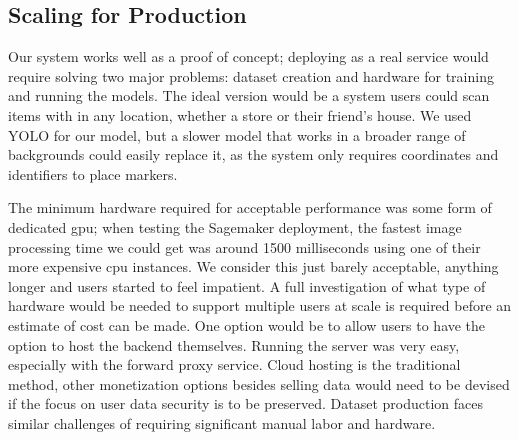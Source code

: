 \documentclass[thesis]{fputhesis}
\begin{document}
\begin{body}
\section{Scaling for Production}
Our system works well as a proof of concept; deploying as a real service would require solving two major problems: dataset creation and hardware for training and running the models. The ideal version would be a system users could scan items with in any location, whether a store or their friend's house. We used YOLO for our model, but a slower model that works in a broader range of backgrounds could easily replace it, as the system only requires coordinates and identifiers to place markers. 

The minimum hardware required for acceptable performance was some form of dedicated \acrshort{gpu}; when testing the Sagemaker deployment, the fastest image processing time we could get was around 1500 milliseconds using one of their more expensive \acrshort{cpu} instances. We consider this just barely acceptable, anything longer and users started to feel impatient. A full investigation of what type of hardware would be needed to support multiple users at scale is required before an estimate of cost can be made. One option would be to allow users to have the option to host the backend themselves. Running the server was very easy, especially with the forward proxy service. Cloud hosting is the traditional method, other monetization options besides selling data would need to be devised if the focus on user data security is to be preserved. Dataset production faces similar challenges of requiring significant manual labor and hardware.


\renewcommand{\bibsection}{\topskip=1in\chapter*{REFERENCES}\topskip=0in \addcontentsline{toc}{chapter}{REFERENCES}}

\singlespacing




\end{body}
\end{document}

